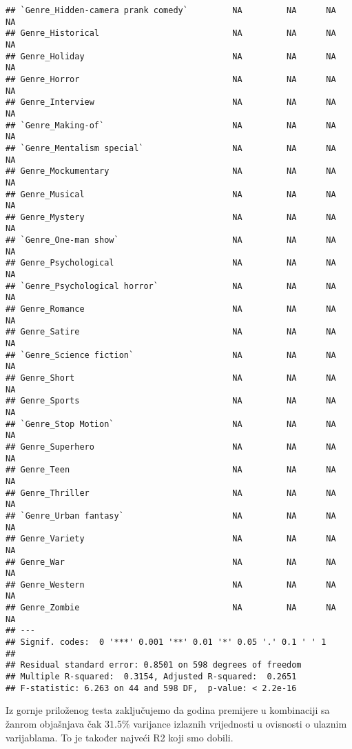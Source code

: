 \documentclass[
]{article}
\begin{document}
\begin{verbatim}
## `Genre_Hidden-camera prank comedy`         NA         NA      NA       NA    
## Genre_Historical                           NA         NA      NA       NA    
## Genre_Holiday                              NA         NA      NA       NA    
## Genre_Horror                               NA         NA      NA       NA    
## Genre_Interview                            NA         NA      NA       NA    
## `Genre_Making-of`                          NA         NA      NA       NA    
## `Genre_Mentalism special`                  NA         NA      NA       NA    
## Genre_Mockumentary                         NA         NA      NA       NA    
## Genre_Musical                              NA         NA      NA       NA    
## Genre_Mystery                              NA         NA      NA       NA    
## `Genre_One-man show`                       NA         NA      NA       NA    
## Genre_Psychological                        NA         NA      NA       NA    
## `Genre_Psychological horror`               NA         NA      NA       NA    
## Genre_Romance                              NA         NA      NA       NA    
## Genre_Satire                               NA         NA      NA       NA    
## `Genre_Science fiction`                    NA         NA      NA       NA    
## Genre_Short                                NA         NA      NA       NA    
## Genre_Sports                               NA         NA      NA       NA    
## `Genre_Stop Motion`                        NA         NA      NA       NA    
## Genre_Superhero                            NA         NA      NA       NA    
## Genre_Teen                                 NA         NA      NA       NA    
## Genre_Thriller                             NA         NA      NA       NA    
## `Genre_Urban fantasy`                      NA         NA      NA       NA    
## Genre_Variety                              NA         NA      NA       NA    
## Genre_War                                  NA         NA      NA       NA    
## Genre_Western                              NA         NA      NA       NA    
## Genre_Zombie                               NA         NA      NA       NA    
## ---
## Signif. codes:  0 '***' 0.001 '**' 0.01 '*' 0.05 '.' 0.1 ' ' 1
## 
## Residual standard error: 0.8501 on 598 degrees of freedom
## Multiple R-squared:  0.3154, Adjusted R-squared:  0.2651 
## F-statistic: 6.263 on 44 and 598 DF,  p-value: < 2.2e-16
\end{verbatim}

Iz gornje priloženog testa zaključujemo da godina premijere u
kombinaciji sa žanrom objašnjava čak 31.5\% varijance izlaznih
vrijednosti u ovisnosti o ulaznim varijablama. To je također najveći R2
koji smo dobili.
\end{document}
